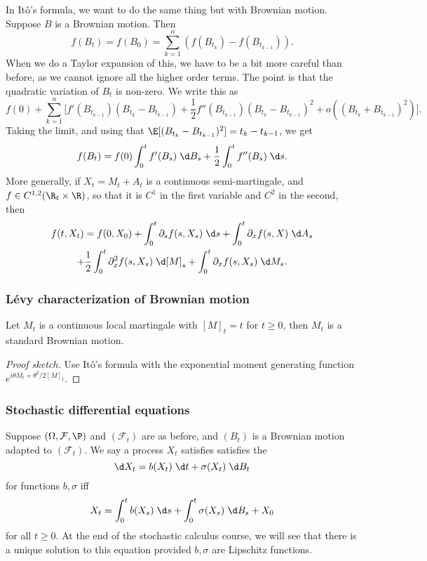 \documentclass[a4paper]{article}
\begin{document}
In It\^o's formula, we want to do the same thing but with Brownian motion. Suppose $B$ is a Brownian motion. Then
\[
  f(B_t) = f(B_0) = \sum_{k = 1}^n (f(B_{t_k}) - f(B_{t_{k - 1}})).
\]
When we do a Taylor expansion of this, we have to be a bit more careful than before, as we cannot ignore all the higher order terms. The point is that the quadratic variation of $B_t$ is non-zero. We write this as
\[
  f(0) + \sum_{k = 1}^n \Big[f'(B_{t_{k - 1}}) (B_{t_k} - B_{t_{k - 1}}) + \frac{1}{2} f''(B_{t_{k - 1}}) (B_{t_k} - B_{t_{k - 1}})^2 + o((B_{t_k} + B_{t_{k - 1}})^2)\Big].
\]
Taking the limit, and using that $\E[(B_{t_k} - B_{t_{k - 1}})^2] = t_k - t_{k - 1}$, we get
\[
  f(B_t) = f(0) \int_0^t f'(B_s)\;\d B_s + \frac{1}{2} \int_0^t f''(B_s) \;\d s.
\]
More generally, if $X_t = M_t + A_t$ is a continuous semi-martingale, and $f \in C^{1, 2}(\R_t \times \R)$, so that it is $C^1$ in the first variable and $C^2$ in the second, then
\begin{multline*}
  f(t, X_t) = f(0, X_0) + \int_0^t \partial_s f(s, X_s) \;\d s + \int_0^t \partial_x f(s, X)\;\d A_s\\
  + \frac{1}{2} \int_0^t \partial_x^2 f(s, X_s) \;\d [M]_s + \int_0^t \partial_x f(s, X_s) \;\d M_s.
\end{multline*}

\subsubsection*{L\'evy characterization of Brownian motion}
\begin{thm}
  Let $M_t$ is a continuous local martingale with $[M]_t = t$ for $t \geq 0$, then $M_t$ is a standard Brownian motion.
\end{thm}

\begin{proof}[Proof sketch]
  Use It\^o's formula with the exponential moment generating function $e^{i\theta M_t + \theta^2/2 [M]_t}$.
\end{proof}

\subsubsection*{Stochastic differential equations}
Suppose $(\Omega, \mathcal{F}, \P)$ and $(\mathcal{F}_t)$ are as before, and $(B_t)$ is a Brownian motion adapted to $(\mathcal{F}_t)$. We say a process $X_t$ satisfies satisfies the 
\[
  \d X_t = b(X_t) \;\d t + \sigma(X_t) \;\d B_t
\]
for functions $b, \sigma$ iff
\[
  X_t = \int_0^t b(X_s) \;\d s + \int_0^t \sigma(X_s) \;\d B_s + X_0
\]
for all $t \geq 0$. At the end of the stochastic calculus course, we will see that there is a unique solution to this equation provided $b, \sigma$ are Lipschitz functions.
\end{document}
